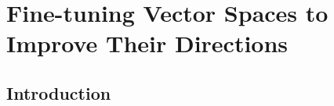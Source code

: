 \chapter{Fine-tuning Vector Spaces to Improve Their Directions}\label{ch5}


\section{Introduction}





